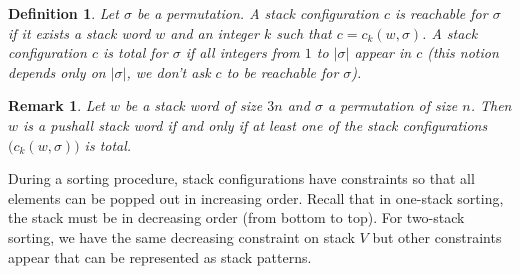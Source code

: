 \documentclass[11pt]{article}
\newtheorem{rem}[thm]{Remark}
\newtheorem{defn}[thm]{Definition}
\begin{document}
\begin{defn}
Let $\sigma$ be a permutation.
A stack configuration $c$ is {\em reachable} for $\sigma$ if it exists a stack word $w$ and an integer $k$ such that $c = c_k(w,\sigma)$.
A stack configuration $c$ is {\em total} for $\sigma$ if all integers from $1$ to $|\sigma|$ appear in $c$ (this notion depends only on $|\sigma|$, we don't ask $c$ to be reachable for $\sigma$).
\end{defn}


\begin{rem}\label{rem:TotalConfigurations}
Let $w$ be a stack word of size $3n$ and $\sigma$ a permutation of size $n$.
Then $w$ is a pushall stack word if and only if at least one of the stack configurations $\big(c_k(w,\sigma)\big)$ is total.
\end{rem}


During a sorting procedure, stack configurations have constraints so that all elements can be popped out in increasing order. 
Recall that in one-stack sorting, the stack must be in decreasing order (from bottom to top). 
For two-stack sorting, we have the same decreasing constraint on stack $V$ but other constraints appear that can be represented as stack patterns.
\end{document}
